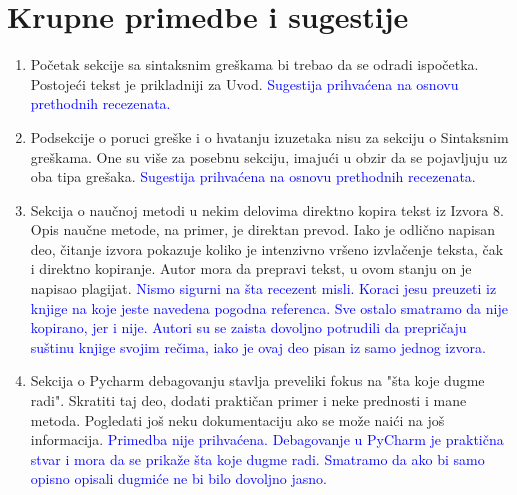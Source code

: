 \documentclass[a4paper]{report}
\newcommand{\odgovor}[1]{\textcolor{blue}{#1}}
\begin{document}
\section{Krupne primedbe i sugestije}
\begin{enumerate}
\item Početak sekcije sa sintaksnim greškama bi trebao da se odradi ispočetka. Postojeći tekst je prikladniji za Uvod.
\odgovor{Sugestija prihvaćena na osnovu prethodnih recezenata.}
\item Podsekcije o poruci greške i o hvatanju izuzetaka nisu za sekciju o Sintaksnim greškama. One su više za posebnu sekciju, imajući u obzir da se pojavljuju uz oba tipa grešaka. 
\odgovor{Sugestija prihvaćena na osnovu prethodnih recezenata.}
\item Sekcija o naučnoj metodi u nekim delovima direktno kopira tekst iz Izvora 8. Opis naučne metode, na primer, je direktan prevod. Iako je odlično napisan deo, čitanje izvora pokazuje koliko je intenzivno vršeno izvlačenje teksta, čak i direktno kopiranje. Autor mora da prepravi tekst, u ovom stanju on je napisao plagijat.
\odgovor{Nismo sigurni na šta recezent misli. Koraci jesu preuzeti iz knjige na koje jeste navedena pogodna referenca. Sve ostalo smatramo da nije kopirano, jer i nije. Autori su se zaista dovoljno potrudili da prepričaju suštinu knjige svojim rečima, iako je ovaj deo pisan iz samo jednog izvora.}
\item Sekcija o Pycharm debagovanju stavlja preveliki fokus na "šta koje dugme radi". Skratiti taj deo, dodati praktičan primer i neke prednosti i mane metoda. Pogledati još neku dokumentaciju ako se može naići na još informacija.
\odgovor{Primedba nije prihvaćena. Debagovanje u PyCharm je praktična stvar i  mora da se prikaže šta koje dugme radi. Smatramo da ako bi samo opisno opisali dugmiće ne bi bilo dovoljno jasno.}
\end{enumerate}
\end{document}
